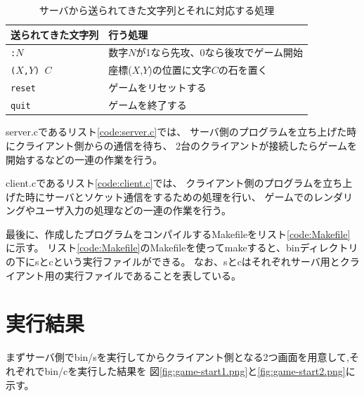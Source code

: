 \documentclass[a4j, titlepage, 10pt]{jsarticle}
\newcommand{\code}[1]{\texttt{#1}}
\begin{document}
\begin{table}[H]
  \centering
  \caption{サーバから送られてきた文字列とそれに対応する処理}
  \label{tab:mapping-received-str-and-corresponding-process}
  \begin{tabular}{ll} \toprule
    送られてきた文字列 & 行う処理 \\
    \midrule
    \code{:$N$} & 数字$N$が1なら先攻、0なら後攻でゲーム開始 \\
    \code{($X$,$Y$) $C$} & 座標($X$,$Y$)の位置に文字$C$の石を置く \\
    \code{reset} & ゲームをリセットする \\
    \code{quit} & ゲームを終了する \\
    \bottomrule
  \end{tabular}
\end{table}

server.cであるリスト\ref{code:server.c}では、
サーバ側のプログラムを立ち上げた時にクライアント側からの通信を待ち、
2台のクライアントが接続したらゲームを開始するなどの一連の作業を行う。

\lstset{ numbers = left }


client.cであるリスト\ref{code:client.c}では、
クライアント側のプログラムを立ち上げた時にサーバとソケット通信をするための処理を行い、
ゲームでのレンダリングやユーザ入力の処理などの一連の作業を行う。

\lstset{ numbers = left }


最後に、作成したプログラムをコンパイルするMakefileをリスト\ref{code:Makefile}に示す。
リスト\ref{code:Makefile}のMakefileを使ってmakeすると、binディレクトリの下にsとcという実行ファイルができる。
なお、sとcはそれぞれサーバ用とクライアント用の実行ファイルであることを表している。

\lstset{ numbers = left }



\section{実行結果}

まずサーバ側でbin/sを実行してからクライアント側となる2つ画面を用意して,それぞれでbin/cを実行した結果を
図\ref{fig:game-start1.png}と\ref{fig:game-start2.png}に示す。
\end{document}
